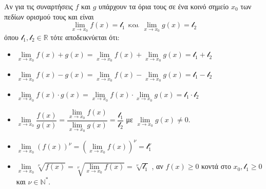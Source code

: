 Αν για τις συναρτήσεις $ f $ και $ g $ υπάρχουν τα όρια τους σε ένα κοινό σημείο $ x_0 $ των πεδίων ορισμού τους και είναι
\[ \lim_{x\to x_0}{f(x)}=\mathcal{l}_1\ \ \text{και}\ \ \lim_{x\to x_0}{g(x)}=\mathcal{l}_2 \]
όπου $ \mathcal{l}_1,\mathcal{l}_2\in\mathbb{R} $ τότε αποδεικνύεται ότι:
\begin{itemize}
\item $ \lim\limits_{x\to x_0}{f(x)+g(x)}=\lim\limits_{x\to x_0}{f(x)}+\lim\limits_{x\to x_0}{g(x)}=\mathcal{l}_1+\mathcal{l}_2 $
\item $ \lim\limits_{x\to x_0}{f(x)-g(x)}=\lim\limits_{x\to x_0}{f(x)}-\lim\limits_{x\to x_0}{g(x)}=\mathcal{l}_1-\mathcal{l}_2 $
\item $ \lim\limits_{x\to x_0}{f(x)\cdot g(x)}=\lim\limits_{x\to x_0}{f(x)}\cdot\lim\limits_{x\to x_0}{g(x)}=\mathcal{l}_1\cdot\mathcal{l}_2 $
\item $ \lim\limits_{x\to x_0}{\dfrac{f(x)}{g(x)}}=\dfrac{\lim\limits_{x\to x_0}{f(x)}}{\lim\limits_{x\to x_0}{g(x)}}=\dfrac{\mathcal{l}_1}{\mathcal{l}_2} $ με $ \lim\limits_{x\to x_0}{g(x)}\neq 0 $.
\item $ \lim\limits_{x\to x_0}{(f(x))^{\nu}}=\left(\lim\limits_{x\to x_0}{f(x)}\right)^{\nu}=\mathcal{l}_1^{\nu} $
\item $ \lim\limits_{x\to x_0}{\sqrt[\nu]{f(x)}}=\sqrt[\nu]{\lim\limits_{x\to x_0}{f(x)}}=\sqrt[\nu]{\mathcal{l}_1} $ , αν $ f(x)\geq 0 $ κοντά στο $ x_0, \mathcal{l}_1\geq 0 $ και $ \nu\in\mathbb{N}^* $.
\end{itemize}
